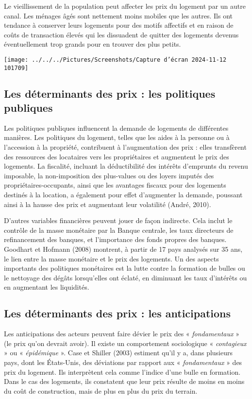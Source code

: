 \documentclass[a4paper, 12pt]{report}
\begin{document}
Le vieillissement de la population peut affecter les prix du logement par un autre canal. Les ménages âgés sont nettement moins mobiles que les autres. Ils ont tendance à conserver leurs logements pour des motifs affectifs et en raison de coûts de transaction élevés qui les dissuadent de quitter des logements devenus éventuellement trop grands pour en trouver des plus petits.

\begin{center}
	\texttt{[image: ../../../Pictures/Screenshots/Capture d'écran 2024-11-12 101709]}
\end{center}

\subsection{Les déterminants des prix : les politiques publiques}

Les politiques publiques influencent la demande de logements de différentes manières. Les politiques du logement, telles que les aides à la personne ou à l’accession à la propriété, contribuent à l’augmentation des prix : elles transfèrent des ressources des locataires vers les propriétaires et augmentent le prix des logements. La fiscalité, incluant la déductibilité des intérêts d’emprunts du revenu imposable, la non-imposition des plus-values ou des loyers imputés des propriétaires-occupants, ainsi que les avantages fiscaux pour des logements destinés à la location, a également pour effet d’augmenter la demande, poussant ainsi à la hausse des prix et augmentant leur volatilité (André, 2010).

D’autres variables financières peuvent jouer de façon indirecte. Cela inclut le contrôle de la masse monétaire par la Banque centrale, les taux directeurs de refinancement des banques, et l’importance des fonds propres des banques. Goodhart et Hofmann (2008) montrent, à partir de 17 pays analysés sur 35 ans, le lien entre la masse monétaire et le prix des logements. Un des aspects importants des politiques monétaires est la lutte contre la formation de bulles ou le nettoyage des dégâts lorsqu’elles ont éclaté, en diminuant les taux d’intérêts ou en augmentant les liquidités.

\subsection{Les déterminants des prix : les anticipations}

Les anticipations des acteurs peuvent faire dévier le prix des « \textit{fondamentaux} » (le prix qu'on devrait avoir). Il existe un comportement sociologique « \textit{contagieux} » ou « \textit{épidémique} ». Case et Shiller (2003) estiment qu’il y a, dans plusieurs pays, dont les États-Unis, des déviations par rapport aux « \textit{fondamentaux} » des prix du logement. Ils interprètent cela comme l’indice d’une bulle en formation. Dans le cas des logements, ils constatent que leur prix résulte de moins en moins du coût de construction, mais de plus en plus du prix du terrain.
\end{document}
